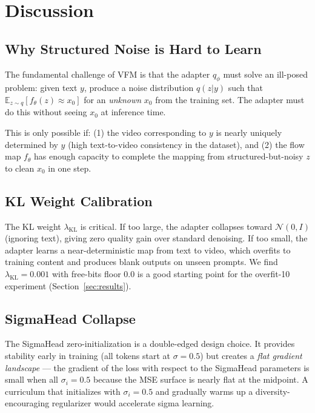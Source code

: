 \documentclass[10pt,twocolumn]{article}
\begin{document}
\section{Discussion}
\label{sec:discussion}

\subsection{Why Structured Noise is Hard to Learn}

The fundamental challenge of VFM is that the adapter $q_\phi$ must solve an ill-posed problem: given text $y$, produce a noise distribution $q(z|y)$ such that $\mathbb{E}_{z \sim q}[f_\theta(z) \approx x_0]$ for an \emph{unknown} $x_0$ from the training set. The adapter must do this without seeing $x_0$ at inference time.

This is only possible if: (1) the video corresponding to $y$ is nearly uniquely determined by $y$ (high text-to-video consistency in the dataset), and (2) the flow map $f_\theta$ has enough capacity to complete the mapping from structured-but-noisy $z$ to clean $x_0$ in one step.

\subsection{KL Weight Calibration}

The KL weight $\lambda_{\text{KL}}$ is critical. If too large, the adapter collapses toward $\mathcal{N}(0,I)$ (ignoring text), giving zero quality gain over standard denoising. If too small, the adapter learns a near-deterministic map from text to video, which overfits to training content and produces blank outputs on unseen prompts. We find $\lambda_{\text{KL}} = 0.001$ with free-bits floor 0.0 is a good starting point for the overfit-10 experiment (Section~\ref{sec:results}).

\subsection{SigmaHead Collapse}

The SigmaHead zero-initialization is a double-edged design choice. It provides stability early in training (all tokens start at $\sigma=0.5$) but creates a \emph{flat gradient landscape} — the gradient of the loss with respect to the SigmaHead parameters is small when all $\sigma_i = 0.5$ because the MSE surface is nearly flat at the midpoint. A curriculum that initializes with $\sigma_i = 0.5$ and gradually warms up a diversity-encouraging regularizer would accelerate sigma learning.
\end{document}
